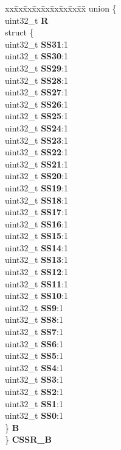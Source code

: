 \begin{DoxyCompactItemize}
\begin{tabbing}
\end{tabbing}\item 
\mbox{\label{structETPU__tag_ad166f9e72977e362066e9021eff23b54}} 
\begin{tabbing}
xx\=xx\=xx\=xx\=xx\=xx\=xx\=xx\=xx\=\kill
union \{\\
\>uint32\_t {\bfseries R}\\
\>struct \{\\
\>\>uint32\_t {\bfseries SS31}:1\\
\>\>uint32\_t {\bfseries SS30}:1\\
\>\>uint32\_t {\bfseries SS29}:1\\
\>\>uint32\_t {\bfseries SS28}:1\\
\>\>uint32\_t {\bfseries SS27}:1\\
\>\>uint32\_t {\bfseries SS26}:1\\
\>\>uint32\_t {\bfseries SS25}:1\\
\>\>uint32\_t {\bfseries SS24}:1\\
\>\>uint32\_t {\bfseries SS23}:1\\
\>\>uint32\_t {\bfseries SS22}:1\\
\>\>uint32\_t {\bfseries SS21}:1\\
\>\>uint32\_t {\bfseries SS20}:1\\
\>\>uint32\_t {\bfseries SS19}:1\\
\>\>uint32\_t {\bfseries SS18}:1\\
\>\>uint32\_t {\bfseries SS17}:1\\
\>\>uint32\_t {\bfseries SS16}:1\\
\>\>uint32\_t {\bfseries SS15}:1\\
\>\>uint32\_t {\bfseries SS14}:1\\
\>\>uint32\_t {\bfseries SS13}:1\\
\>\>uint32\_t {\bfseries SS12}:1\\
\>\>uint32\_t {\bfseries SS11}:1\\
\>\>uint32\_t {\bfseries SS10}:1\\
\>\>uint32\_t {\bfseries SS9}:1\\
\>\>uint32\_t {\bfseries SS8}:1\\
\>\>uint32\_t {\bfseries SS7}:1\\
\>\>uint32\_t {\bfseries SS6}:1\\
\>\>uint32\_t {\bfseries SS5}:1\\
\>\>uint32\_t {\bfseries SS4}:1\\
\>\>uint32\_t {\bfseries SS3}:1\\
\>\>uint32\_t {\bfseries SS2}:1\\
\>\>uint32\_t {\bfseries SS1}:1\\
\>\>uint32\_t {\bfseries SS0}:1\\
\>\} {\bfseries B}\\
\} {\bfseries CSSR\_B}\\


\end{tabbing}
\end{DoxyCompactItemize}
